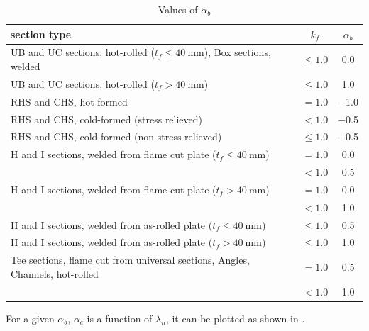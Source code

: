 \begin{table}[htbp]
\centering\footnotesize
\caption{Values of $\alpha_b$}\label{tab:alpha_b}
\begin{tabular}{m{10cm}cc}
	\toprule
	section type                                                                               &     $k_f$      & $\alpha_b$ \\ \midrule
	UB and UC sections, hot-rolled ($t_f\leqslant\SI{40}{\mm}$), Box sections, welded & $\leqslant1.0$ & \num{0.0}  \\
	UB and UC sections, hot-rolled ($t_f>\SI{40}{\mm}$)                               & $\leqslant1.0$ & \num{1.0}  \\
	RHS and CHS, hot-formed                                                                    &     $=1.0$     & \num{-1.0} \\
	RHS and CHS, cold-formed (stress relieved)                                                 &     $<1.0$     & \num{-0.5} \\
	RHS and CHS, cold-formed (non-stress relieved)                                             & $\leqslant1.0$ & \num{-0.5} \\
	H and I sections, welded from flame cut plate ($t_f\leqslant\SI{40}{\mm}$)        &     $=1.0$     & \num{0.0}  \\
	                                                                                           &     $<1.0$     & \num{0.5}  \\
	H and I sections, welded from flame cut plate ($t_f>\SI{40}{\mm}$)                &     $=1.0$     & \num{0.0}  \\
	                                                                                           &     $<1.0$     & \num{1.0}  \\
	H and I sections, welded from as-rolled plate ($t_f\leqslant\SI{40}{\mm}$)        & $\leqslant1.0$ & \num{0.5}  \\
	H and I sections, welded from as-rolled plate ($t_f>\SI{40}{\mm}$)                & $\leqslant1.0$ & \num{1.0}  \\
	Tee sections, flame cut from universal sections, Angles, Channels, hot-rolled              &     $=1.0$     & \num{0.5}  \\
	                                                                                           &     $<1.0$     & \num{1.0}  \\ \bottomrule
\end{tabular}
\end{table}
For a given $\alpha_b$, $\alpha_c$ is a function of $\lambda_n$, it can be plotted as shown in .


